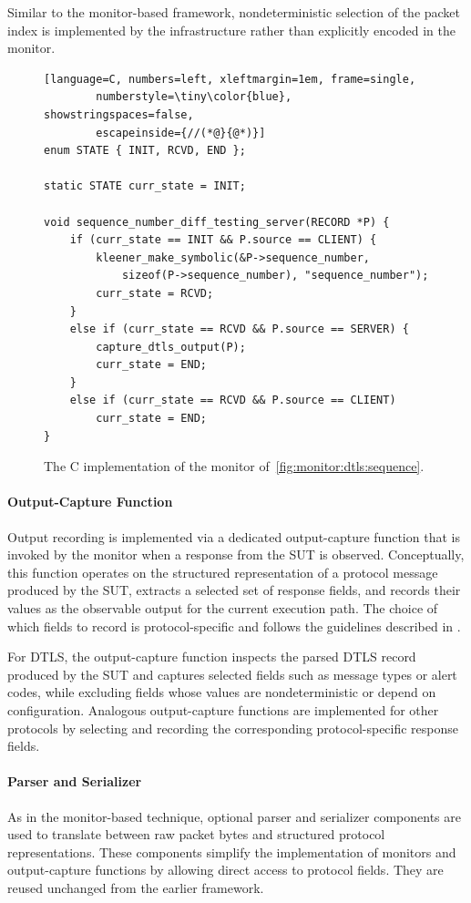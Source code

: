 Similar to the monitor-based framework, nondeterministic selection of the packet index is implemented by the infrastructure rather than explicitly encoded in the monitor.

\begin{figure}[t]
	\begin{lstlisting}[language=C, numbers=left, xleftmargin=1em, frame=single,
		numberstyle=\tiny\color{blue}, showstringspaces=false,
		escapeinside={//(*@}{@*)}]
enum STATE { INIT, RCVD, END }; 

static STATE curr_state = INIT;

void sequence_number_diff_testing_server(RECORD *P) {
	if (curr_state == INIT && P.source == CLIENT) {
		kleener_make_symbolic(&P->sequence_number,
			sizeof(P->sequence_number), "sequence_number");
		curr_state = RCVD;
	}
	else if (curr_state == RCVD && P.source == SERVER) {
		capture_dtls_output(P);
		curr_state = END;
	}
	else if (curr_state == RCVD && P.source == CLIENT)
		curr_state = END;
}
	\end{lstlisting}
	\caption{The C implementation of the monitor of~\cref{fig:monitor:dtls:sequence}.}
	\label{fig:dse-implementation:monitor}
\end{figure}

\paragraph{Output-Capture Function}
Output recording is implemented via a dedicated output-capture function that is invoked by the monitor when a response from the SUT is observed.
Conceptually, this function operates on the structured representation of a protocol message produced by the SUT, extracts a selected set of response fields, and records their values as the observable output for the current execution path.
The choice of which fields to record is protocol-specific and follows the guidelines described in .

For DTLS, the output-capture function inspects the parsed DTLS record produced by the SUT and captures selected fields such as message types or alert codes, while excluding fields whose values are nondeterministic or depend on configuration.
Analogous output-capture functions are implemented for other protocols by selecting and recording the corresponding protocol-specific response fields.

\paragraph{Parser and Serializer}
As in the monitor-based technique, optional parser and serializer components are used to translate between raw packet bytes and structured protocol representations.
These components simplify the implementation of monitors and output-capture functions by allowing direct access to protocol fields.
They are reused unchanged from the earlier framework.

